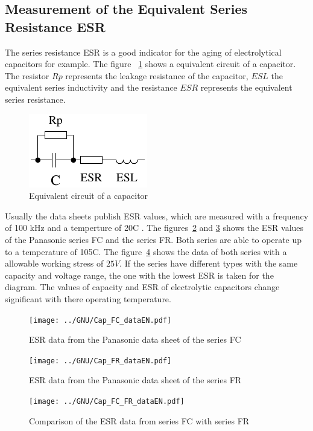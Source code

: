 \subsection{Measurement of the Equivalent Series Resistance ESR}
The series resistance ESR \cite{ESR} is a good indicator for the aging of electrolytical capacitors for example.
The figure ~\ref{fig:Cap_equiv} shows a equivalent circuit of a capacitor.
The resistor \(Rp\) represents the leakage resistance of the capacitor, \(ESL\) the equivalent series inductivity and
the resistance \(ESR\) represents the equivalent series resistance.

\begin{figure}[H]
  \centering
    \includegraphics[width=.3\textwidth]{../FIG/Cap_equiv.pdf}
  \caption{Equivalent circuit of a capacitor}
  \label{fig:Cap_equiv}
\end{figure}

Usually the data sheets publish ESR values, which are measured with a frequency of 100 kHz and a temperture 
of 20\textdegree C .
The figures~\ref{fig:Cap_FC_data} and \ref{fig:Cap_FR_data} shows the ESR values of the Panasonic series FC and 
the  series FR.
Both series are able to operate up to a temperature of 105\textdegree C.
The figure~\ref{fig:Cap_FC_FR_data} shows the data of both series with a allowable working stress of \(25V\).
If the series have different types with the same capacity and voltage range, the one with the lowest ESR is
taken for the diagram.
The values of capacity and ESR of electrolytic capacitors change significant with there operating temperature.

\begin{figure}[H]
  \centering
    \texttt{[image: ../GNU/Cap\_FC\_dataEN.pdf]}
  \caption{ESR data from the Panasonic data sheet of the series FC}
  \label{fig:Cap_FC_data}
\end{figure}

\begin{figure}[H]
  \centering
    \texttt{[image: ../GNU/Cap\_FR\_dataEN.pdf]}
  \caption{ESR data from the Panasonic data sheet of the series FR}
  \label{fig:Cap_FR_data}
\end{figure}

\begin{figure}[H]
  \centering
    \texttt{[image: ../GNU/Cap\_FC\_FR\_dataEN.pdf]}
  \caption{Comparison of the ESR data from series FC with series FR}
  \label{fig:Cap_FC_FR_data}
\end{figure}

